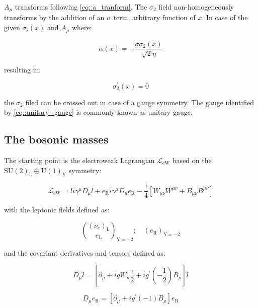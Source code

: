 $A_{\mu}$ transforms following \autoref{eq::a_tranform}. The $\sigma_{2}$ field non-homogeneously transforms by the addition of an $\alpha$ term, arbitrary function of $x$. In case of the given $\sigma_{i}(x)$ and $A_{\mu}$ where:

\begin{equation}
\alpha(x) = -\dfrac{σ\sigma_{2}(x)}{\sqrt{2}\eta}
\end{equation}

resulting in:

\begin{equation}
\sigma^{\prime}_{2}(x) = 0
\label{eq::unitary_gauge}
\end{equation}

the $\sigma_{2}$ filed can be crossed out in case of a gauge symmetry. The gauge identified by \autoref{eq::unitary_gauge} is commonly known as unitary gauge.

\subsection{The bosonic masses}

The starting point is the electroweak Lagrangian $\mathcal{L}_{\text{eW}}$ based on the $\text{SU}(2)_{\text{L}} \oplus \text{U}(1)_{\text{Y}}$ symmetry:

\begin{equation}
\mathcal{L}_{\text{eW}} = \bar{l}i\gamma^{\mu} D_{\mu}l + \bar{e}_{\text{R}}i\gamma^{\mu}D_{\mu}e_{\text{R}} - \dfrac{1}{4}[W_{\mu\nu}W^{\mu\nu} +B_{\mu\nu}B^{\mu\nu}]
\label{eq::lagrangian_ew}
\end{equation}

with the leptonic fields defined as:

\begin{equation}
\binom{(\nu_{e})_{\text{L}}}{e_{\text{L}}}_{\text{Y}=−2} ; \quad (e_{\text{R}})_{\text{Y}=−2}
\label{eq::fields_scheme}
\end{equation}

and the covariant derivatives and tensors defined as:

\begin{equation}
D_{\mu}l = [\partial_{\mu} + igW_{\mu} \dfrac{\tau}{2}  + ig^{\prime}(-\dfrac{1}{2})B_{\mu}]l 
\end{equation}

\begin{equation}
D_{\mu}e_{\text{R}} = [\partial_{\mu} + ig^{\prime}(-1)B_{\mu}]e_{\text{R}}
\end{equation}

